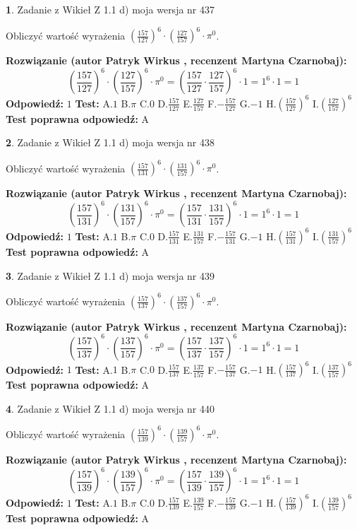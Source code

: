\documentclass[12pt, a4paper]{article}
\theoremstyle{definition} %
\newtheorem{zad}{}
\newcommand{\zadStart}[1]{\begin{zad}#1\newline}
\newcommand{\zadStop}{\end{zad}}
\newcommand{\rozwStart}[2]{\noindent \textbf{Rozwiązanie (autor #1 , recenzent #2): }\newline}
\newcommand{\rozwStop}{\newline}
\newcommand{\odpStart}{\noindent \textbf{Odpowiedź:}\newline}
\newcommand{\odpStop}{\newline}
\newcommand{\testStart}{\noindent \textbf{Test:}\newline}
\newcommand{\testStop}{\newline}
\newcommand{\kluczStart}{\noindent \textbf{Test poprawna odpowiedź:}\newline}
\newcommand{\kluczStop}{\newline}
\begin{document}
\zadStart{Zadanie z Wikieł Z 1.1 d) moja wersja nr 437}

Obliczyć wartość wyrażenia $(\frac{157}{127})^{6} \cdot (\frac{127}{157})^{6} \cdot \pi^{0}$.
\zadStop
\rozwStart{Patryk Wirkus}{Martyna Czarnobaj}
$$(\frac{157}{127})^{6} \cdot (\frac{127}{157})^{6} \cdot \pi^{0} = (\frac{157}{127} \cdot \frac{127}{157})^{6} \cdot 1 = 1^{6} \cdot 1 = 1$$
\rozwStop
\odpStart
$1$
\odpStop
\testStart
A.$1$ B.$\pi$ C.$0$ D.$\frac{157}{127}$ E.$\frac{127}{157}$
F.$-\frac{157}{127}$ G.$-1$
H.$(\frac{157}{127})^{6}$
I.$(\frac{127}{157})^{6}$
\testStop
\kluczStart
A
\kluczStop



\zadStart{Zadanie z Wikieł Z 1.1 d) moja wersja nr 438}

Obliczyć wartość wyrażenia $(\frac{157}{131})^{6} \cdot (\frac{131}{157})^{6} \cdot \pi^{0}$.
\zadStop
\rozwStart{Patryk Wirkus}{Martyna Czarnobaj}
$$(\frac{157}{131})^{6} \cdot (\frac{131}{157})^{6} \cdot \pi^{0} = (\frac{157}{131} \cdot \frac{131}{157})^{6} \cdot 1 = 1^{6} \cdot 1 = 1$$
\rozwStop
\odpStart
$1$
\odpStop
\testStart
A.$1$ B.$\pi$ C.$0$ D.$\frac{157}{131}$ E.$\frac{131}{157}$
F.$-\frac{157}{131}$ G.$-1$
H.$(\frac{157}{131})^{6}$
I.$(\frac{131}{157})^{6}$
\testStop
\kluczStart
A
\kluczStop



\zadStart{Zadanie z Wikieł Z 1.1 d) moja wersja nr 439}

Obliczyć wartość wyrażenia $(\frac{157}{137})^{6} \cdot (\frac{137}{157})^{6} \cdot \pi^{0}$.
\zadStop
\rozwStart{Patryk Wirkus}{Martyna Czarnobaj}
$$(\frac{157}{137})^{6} \cdot (\frac{137}{157})^{6} \cdot \pi^{0} = (\frac{157}{137} \cdot \frac{137}{157})^{6} \cdot 1 = 1^{6} \cdot 1 = 1$$
\rozwStop
\odpStart
$1$
\odpStop
\testStart
A.$1$ B.$\pi$ C.$0$ D.$\frac{157}{137}$ E.$\frac{137}{157}$
F.$-\frac{157}{137}$ G.$-1$
H.$(\frac{157}{137})^{6}$
I.$(\frac{137}{157})^{6}$
\testStop
\kluczStart
A
\kluczStop



\zadStart{Zadanie z Wikieł Z 1.1 d) moja wersja nr 440}

Obliczyć wartość wyrażenia $(\frac{157}{139})^{6} \cdot (\frac{139}{157})^{6} \cdot \pi^{0}$.
\zadStop
\rozwStart{Patryk Wirkus}{Martyna Czarnobaj}
$$(\frac{157}{139})^{6} \cdot (\frac{139}{157})^{6} \cdot \pi^{0} = (\frac{157}{139} \cdot \frac{139}{157})^{6} \cdot 1 = 1^{6} \cdot 1 = 1$$
\rozwStop
\odpStart
$1$
\odpStop
\testStart
A.$1$ B.$\pi$ C.$0$ D.$\frac{157}{139}$ E.$\frac{139}{157}$
F.$-\frac{157}{139}$ G.$-1$
H.$(\frac{157}{139})^{6}$
I.$(\frac{139}{157})^{6}$
\testStop
\kluczStart
A
\kluczStop
\end{document}
